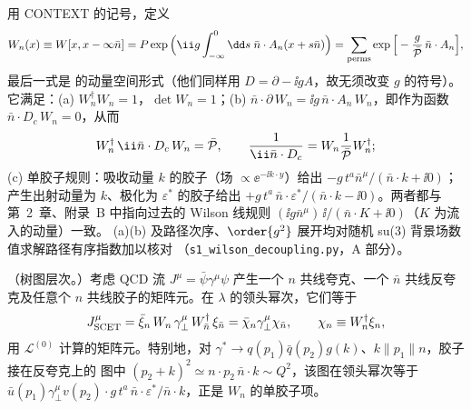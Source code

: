 用 CONTEXT 的记号，定义
\begin{equation}\label{eq:scet-Wn}
W_n(x)\equiv W[x,x-\infty\bar n]=P\exp\Big(\ii g\int_{-\infty}^0\dd s\;\bar n\cdot A_n(x+s\bar n)\Big)
=\sum_{\rm perms}\exp\Big[-\frac{g}{\Pbar}\,\bar n\cdot A_n\Big],
\end{equation}
最后一式是 \cite{BauerPirjolStewart2001} 的动量空间形式（他们同样用 $D=\partial-\ii gA$，故无须改变 $g$ 的符号）。
它满足：(a) $W_n^\dagger W_n=1$，$\det W_n=1$；(b) $\bar n\cdot\partial\,W_n=\ii g\,\bar n\cdot A_n\,W_n$，即作为函数
$\bar n\cdot D_c\,W_n=0$，从而
\begin{equation}\label{eq:scet-Winv}
W_n^\dagger\,\ii\bar n\cdot D_c\,W_n=\Pbar,\qquad \frac{1}{\ii\bar n\cdot D_c}=W_n\frac{1}{\Pbar}W_n^\dagger ;
\end{equation}
(c) 单胶子规则：吸收动量 $k$ 的胶子（场 $\propto\ee^{-\ii k\cdot y}$）给出 $-g\,t^a\bar n^\mu/(\bar n\cdot k+\ii0)$；
产生出射动量为 $k$、极化为 $\varepsilon^*$ 的胶子给出 $+g\,t^a\,\bar n\cdot\varepsilon^*/(\bar n\cdot k-\ii0)$。两者都与
第~2~章、附录~B 中指向过去的 Wilson 线规则 $(\ii g\bar n^\mu)\,\ii/(\bar n\cdot K+\ii0)$（$K$ 为流入的动量）一致。
(a)(b) 及路径次序、$\order{g^2}$ 展开均对随机 su(3) 背景场数值求解路径有序指数加以核对
（\texttt{s1\_\allowbreak wilson\_\allowbreak decoupling.py}，A 部分）。

\begin{proposition}[$W_n$ 来自积出离壳模式]\tagR\label{prop:scet-wilson}
（树图层次。）考虑 QCD 流 $J^\mu=\bar\psi\gamma^\mu\psi$ 产生一个 $n$ 共线夸克、一个 $\bar n$ 共线反夸克及任意个
$n$ 共线胶子的矩阵元。在 $\lambda$ 的领头幂次，它们等于
\begin{equation}\label{eq:scet-Jtree}
J^\mu_{\rm SCET}=\bar\xi_n\,W_n\,\gamma_\perp^\mu\,W_{\bar n}^\dagger\,\xi_{\bar n}=\bar\chi_n\gamma_\perp^\mu\chi_{\bar n},
\qquad \chi_n\equiv W_n^\dagger\xi_n,
\end{equation}
用 $\mathcal L^{(0)}$ 计算的矩阵元。特别地，对 $\gamma^*\to q(p_1)\bar q(p_2)g(k)$、$k\parallel p_1\parallel n$，胶子接在反夸克上的
图中 $(p_2+k)^2\simeq n\cdot p_2\,\bar n\cdot k\sim Q^2$，该图在领头幂次等于
$\bar u(p_1)\gamma^\mu_\perp v(p_2)\cdot g\,t^a\,\bar n\cdot\varepsilon^*/\bar n\cdot k$，正是 $W_n$ 的单胶子项。
\end{proposition}

